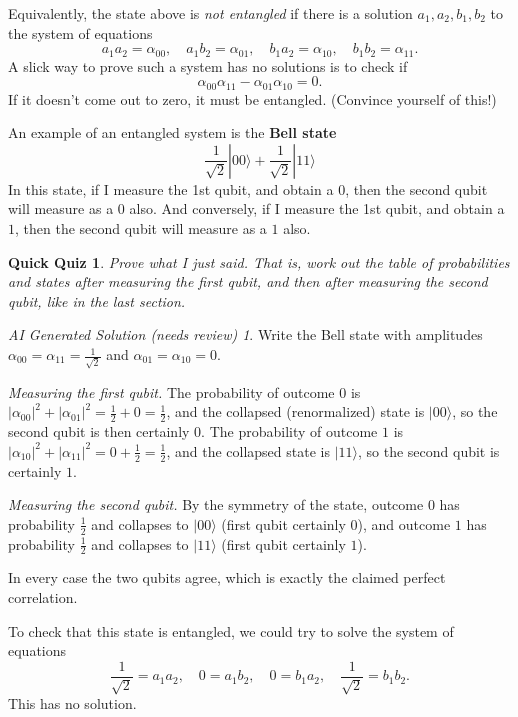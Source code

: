 \documentclass{article}
\theoremstyle{plain}
\newtheorem{quiz}[theorem]{Quick Quiz}
\theoremstyle{definition}
\theoremstyle{remark}
\newtheorem*{aisolution}{AI Generated Solution (needs review)}
\numberwithin{theorem}{section}
\begin{document}
Equivalently, the state above is \emph{not entangled} if there is a solution $a_1,a_2,b_1,b_2$ to the system of equations
\[
a_1a_2 = \alpha_{00},\quad
a_1b_2 = \alpha_{01},\quad
b_1a_2 = \alpha_{10},\quad
b_1b_2 = \alpha_{11}.
\]
A slick way to prove such a system has no solutions is to check if
\[
\alpha_{00} \alpha_{11} - \alpha_{01}\alpha_{10} = 0.
\]
If it doesn't come out to zero, it must be entangled.  (Convince yourself of this!)






An example of an entangled system is the \textbf{Bell state}
\[
\frac{1}{\sqrt{2}} |00 \rangle +
\frac{1}{\sqrt{2}} |11 \rangle
\]
In this state, if I measure the 1st qubit, and obtain a $0$, then the second qubit will measure as a $0$ also.  And conversely, if I measure the 1st qubit, and obtain a $1$, then the second qubit will measure as a $1$ also. 

\begin{quiz}
Prove what I just said.  That is, work out the table of probabilities and states after measuring the first qubit, and then after measuring the second qubit, like in the last section.
\end{quiz}
\begin{aisolution}
Write the Bell state with amplitudes $\alpha_{00} = \alpha_{11} = \frac{1}{\sqrt2}$ and $\alpha_{01} = \alpha_{10} = 0$.

\emph{Measuring the first qubit.}  The probability of outcome $0$ is $|\alpha_{00}|^2 + |\alpha_{01}|^2 = \frac12 + 0 = \frac12$, and the collapsed (renormalized) state is $|00\rangle$, so the second qubit is then certainly $0$.  The probability of outcome $1$ is $|\alpha_{10}|^2 + |\alpha_{11}|^2 = 0 + \frac12 = \frac12$, and the collapsed state is $|11\rangle$, so the second qubit is certainly $1$.

\emph{Measuring the second qubit.}  By the symmetry of the state, outcome $0$ has probability $\frac12$ and collapses to $|00\rangle$ (first qubit certainly $0$), and outcome $1$ has probability $\frac12$ and collapses to $|11\rangle$ (first qubit certainly $1$).

In every case the two qubits agree, which is exactly the claimed perfect correlation.
\end{aisolution}

To check that this state is entangled, we could try to solve the system of equations
\[
\frac{1}{\sqrt{2}} = a_1a_2, \quad
0 = a_1b_2, \quad
0 = b_1a_2,\quad
\frac{1}{\sqrt{2}} = b_1b_2.
\]
This has no solution.  
\end{document}

